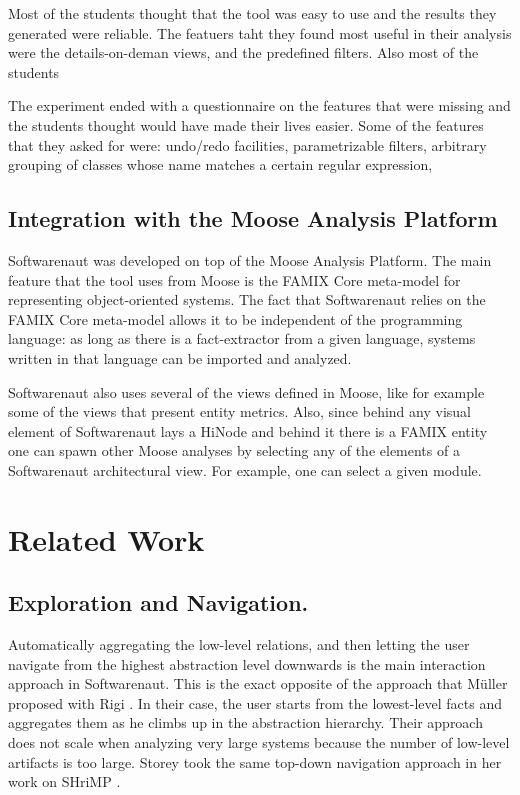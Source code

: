 \documentclass[preprint,12pt]{elsarticle}
\begin{document}
Most of the students thought that the tool was easy to use and the results they generated were reliable. The featuers taht they found most useful in their analysis were the details-on-deman views, and the predefined filters. Also most of the students 

The experiment ended with a questionnaire on the features that were missing and the students thought would have made their lives easier. Some of the features that they asked for were: undo/redo facilities, parametrizable filters, arbitrary grouping of classes whose name matches a certain regular expression, 

\subsection {Integration with the Moose Analysis Platform}
Softwarenaut was developed on top of the Moose Analysis Platform. The main feature that the tool uses from Moose is the FAMIX Core meta-model for representing object-oriented systems. The fact that Softwarenaut relies on the FAMIX Core meta-model allows it to be independent of the programming language: as long as there is a fact-extractor from a given language, systems written in that language can be imported and analyzed. 

Softwarenaut also uses several of the views defined in Moose, like for example some of the views that present entity metrics. Also, since behind any visual element of Softwarenaut lays a HiNode and behind it there is a FAMIX entity one can spawn other Moose analyses by selecting any of the elements of a Softwarenaut architectural view. For example, one can select a given module.



\section {Related Work}
\label {sec:rel}

\subsection {Exploration and Navigation.} Automatically aggregating the low-level relations, and then letting the user navigate from the highest abstraction level downwards is the main interaction approach in Softwarenaut. This is the exact opposite of the approach that M{\"u}ller proposed with Rigi \cite{muller-revengenv}. In their case, the user starts from the lowest-level facts and aggregates them as he climbs up in the abstraction hierarchy. Their approach does not scale when analyzing very large systems because the number of low-level artifacts is too large. Storey took the same top-down navigation approach in her work on SHriMP \cite{storey-shrimp}.
\end{document}
